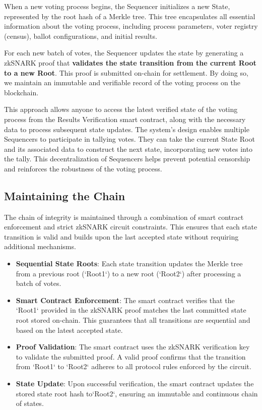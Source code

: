 
When a new voting process begins, the Sequencer initializes a new State, represented by the root hash of a Merkle tree. This tree encapsulates all essential information about the voting process, including process parameters, voter registry (census), ballot configurations, and initial results.

For each new batch of votes, the Sequencer updates the state by generating a zkSNARK proof that \textbf{validates the state transition from the current Root to a new Root}. This proof is submitted on-chain for settlement. By doing so, we maintain an immutable and verifiable record of the voting process on the blockchain.

This approach allows anyone to access the latest verified state of the voting process from the Results Verification smart contract, along with the necessary data to process subsequent state updates. The system's design enables multiple Sequencers to participate in tallying votes. They can take the current State Root and its associated data to construct the next state, incorporating new votes into the tally. This decentralization of Sequencers helps prevent potential censorship and reinforces the robustness of the voting process.

\subsection{Maintaining the Chain}

The chain of integrity is maintained through a combination of smart contract enforcement and strict zkSNARK circuit constraints. This ensures that each state transition is valid and builds upon the last accepted state without requiring additional mechanisms.

\begin{itemize}
	\item \textbf{Sequential State Roots}: Each state transition updates the Merkle tree from a previous root (`Root1`) to a new root (`Root2`) after processing a batch of votes.
	\item \textbf{Smart Contract Enforcement}: The smart contract verifies that the `Root1` provided in the zkSNARK proof matches the last committed state root stored on-chain. This guarantees that all transitions are sequential and based on the latest accepted state.
	\item \textbf{Proof Validation}: The smart contract uses the zkSNARK verification key to validate the submitted proof. A valid proof confirms that the transition from `Root1` to `Root2` adheres to all protocol rules enforced by the circuit.
	\item \textbf{State Update}: Upon successful verification, the smart contract updates the stored state root hash to`Root2`, ensuring an immutable and continuous chain of states.
\end{itemize}

